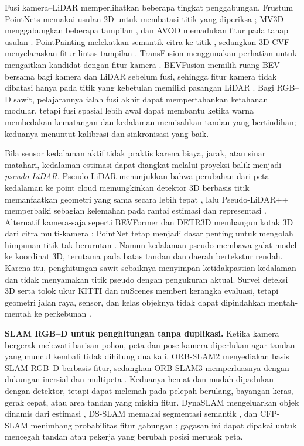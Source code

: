 Fusi kamera--LiDAR memperlihatkan beberapa tingkat penggabungan. Frustum PointNets memakai usulan 2D untuk membatasi titik yang diperiksa \cite{qi2018frustum}; MV3D menggabungkan beberapa tampilan \cite{chen2017mv3d}, dan AVOD memadukan fitur pada tahap usulan \cite{ku2018avod}. PointPainting melekatkan semantik citra ke titik \cite{vora2020pointpainting}, sedangkan 3D-CVF menyelaraskan fitur lintas-tampilan \cite{yoo20203dcvf}. TransFusion menggunakan perhatian untuk mengaitkan kandidat dengan fitur kamera \cite{bai2022transfusion}. BEVFusion memilih ruang BEV bersama bagi kamera dan LiDAR sebelum fusi, sehingga fitur kamera tidak dibatasi hanya pada titik yang kebetulan memiliki pasangan LiDAR \cite{liu2023bevfusion}. Bagi RGB--D sawit, pelajarannya ialah fusi akhir dapat mempertahankan ketahanan modular, tetapi fusi spasial lebih awal dapat membantu ketika warna membedakan kematangan dan kedalaman memisahkan tandan yang bertindihan; keduanya menuntut kalibrasi dan sinkronisasi yang baik.

Bila sensor kedalaman aktif tidak praktis karena biaya, jarak, atau sinar matahari, kedalaman estimasi dapat diangkat melalui proyeksi balik menjadi \textit{pseudo-LiDAR}. Pseudo-LiDAR menunjukkan bahwa perubahan dari peta kedalaman ke point cloud memungkinkan detektor 3D berbasis titik memanfaatkan geometri yang sama secara lebih tepat \cite{wang2019pseudolidar}, lalu Pseudo-LiDAR++ memperbaiki sebagian kelemahan pada rantai estimasi dan representasi \cite{you2020pseudolidarpp}. Alternatif kamera-saja seperti BEVFormer dan DETR3D membangun kotak 3D dari citra multi-kamera \cite{li2022bevformer,wang2022detr3d}; PointNet tetap menjadi dasar penting untuk mengolah himpunan titik tak berurutan \cite{qi2017pointnet}. Namun kedalaman pseudo membawa galat model ke koordinat 3D, terutama pada batas tandan dan daerah bertekstur rendah. Karena itu, penghitungan sawit sebaiknya menyimpan ketidakpastian kedalaman dan tidak menyamakan titik pseudo dengan pengukuran aktual. Survei deteksi 3D serta tolok ukur KITTI dan nuScenes memberi kerangka evaluasi, tetapi geometri jalan raya, sensor, dan kelas objeknya tidak dapat dipindahkan mentah-mentah ke perkebunan \cite{arnold2019survey3d,geiger2012kitti,caesar2020nuscenes}.

\textbf{SLAM RGB--D untuk penghitungan tanpa duplikasi.} Ketika kamera bergerak melewati barisan pohon, peta dan pose kamera diperlukan agar tandan yang muncul kembali tidak dihitung dua kali. ORB-SLAM2 menyediakan basis SLAM RGB--D berbasis fitur, sedangkan ORB-SLAM3 memperluasnya dengan dukungan inersial dan multipeta \cite{murartal2017orbslam2,campos2021orbslam3}. Keduanya hemat dan mudah dipadukan dengan detektor, tetapi dapat melemah pada pelepah berulang, bayangan keras, gerak cepat, atau area tandan yang miskin fitur. DynaSLAM mengeluarkan objek dinamis dari estimasi \cite{bescos2018dynaslam}, DS-SLAM memakai segmentasi semantik \cite{yu2018dsslam}, dan CFP-SLAM menimbang probabilitas fitur gabungan \cite{hu2022cfpslam}; gagasan ini dapat dipakai untuk mencegah tandan atau pekerja yang berubah posisi merusak peta.

